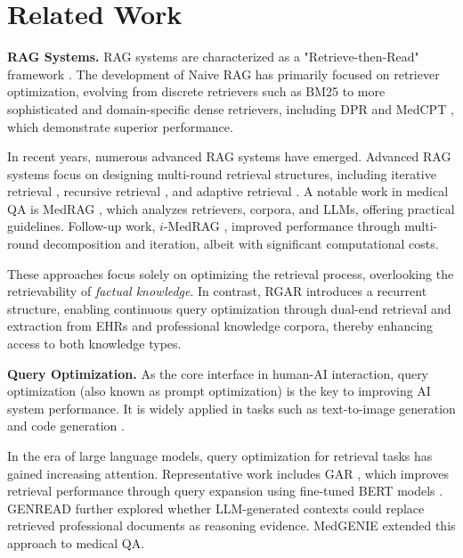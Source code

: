 \section{Related Work}
\textbf{RAG Systems. } RAG systems are characterized as a "Retrieve-then-Read" framework \cite{gao2023retrieval}. The development of Naive RAG has primarily focused on retriever optimization, evolving from discrete retrievers such as BM25 \cite{friedman1977algorithm} to more sophisticated and domain-specific dense retrievers, including DPR \cite{karpukhin-etal-2020-dense} and MedCPT \cite{jin2023medcpt}, which demonstrate superior performance.

In recent years, numerous advanced RAG systems have emerged. Advanced RAG systems focus on designing multi-round retrieval structures, including iterative retrieval \cite{sun2019pullnet}, recursive retrieval \cite{sarthi2024raptor}, and adaptive retrieval \cite{jeong-etal-2024-adaptive}. A notable work in medical QA is MedRAG \cite{xiong-etal-2024-benchmarking}, which analyzes retrievers, corpora, and LLMs, offering practical guidelines. Follow-up work, $i$-MedRAG \cite{xiong2024improving}, improved performance through multi-round decomposition and iteration, albeit with significant computational costs.

These approaches focus solely on optimizing the retrieval process, overlooking the retrievability of \textit{factual knowledge}. In contrast, RGAR introduces a recurrent structure, enabling continuous query optimization through dual-end retrieval and extraction from EHRs and professional knowledge corpora, thereby enhancing access to both knowledge types.

\textbf{Query Optimization. } As the core interface in human-AI interaction, query optimization (also known as prompt optimization) is the key to improving AI system performance. It is widely applied in tasks such as text-to-image generation \cite{liu2022compositional, wu-etal-2024-universal} and code generation \cite{nazzal2024promsec}.

In the era of large language models, query optimization for retrieval tasks has gained increasing attention. Representative work includes GAR \cite{mao-etal-2021-generation}, which improves retrieval performance through query expansion using fine-tuned BERT models \cite{devlin-etal-2019-bert}. GENREAD \cite{yu2023generate} further explored whether LLM-generated contexts could replace retrieved professional documents as reasoning evidence. MedGENIE \cite{frisoni-etal-2024-generate} extended this approach to medical QA.

